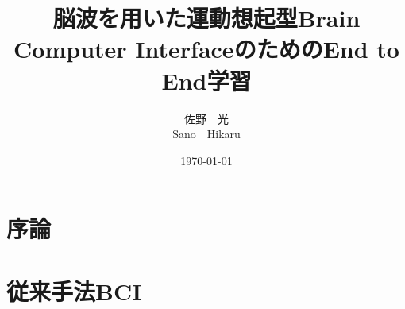 \documentclass[a4j,12pt, oneside, openany, report]{jsbook}
\title{\mc 脳波を用いた運動想起型{\rm Brain Computer Interface}のためのEnd to End学習}
\author{\mc 佐野\ \ 光 \\ \rm Sano\ \ Hikaru}
\date{\today}
\begin{document}
%


%
\maketitle
%
%
\frontmatter
% 

% 
\setcounter{tocdepth}{2}
\tableofcontents
%
%
\mainmatter






\chapter{{\mc 序論}}




\chapter{{\mc 従来手法}{\rm BCI}}


\end{document}
